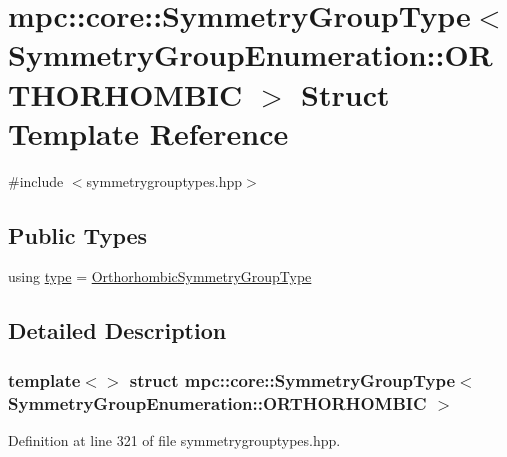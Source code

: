 \hypertarget{structmpc_1_1core_1_1_symmetry_group_type_3_01_symmetry_group_enumeration_1_1_o_r_t_h_o_r_h_o_m_b_i_c_01_4}{}\section{mpc\+:\+:core\+:\+:Symmetry\+Group\+Type$<$ Symmetry\+Group\+Enumeration\+:\+:O\+R\+T\+H\+O\+R\+H\+O\+M\+B\+IC $>$ Struct Template Reference}
\label{structmpc_1_1core_1_1_symmetry_group_type_3_01_symmetry_group_enumeration_1_1_o_r_t_h_o_r_h_o_m_b_i_c_01_4}


{\ttfamily \#include $<$symmetrygrouptypes.\+hpp$>$}

\subsection*{Public Types}
\begin{DoxyCompactItemize}
\item 
using \mbox{\hyperlink{structmpc_1_1core_1_1_symmetry_group_type_3_01_symmetry_group_enumeration_1_1_o_r_t_h_o_r_h_o_m_b_i_c_01_4_aa03457fea042819a7f1a790049474067}{type}} = \mbox{\hyperlink{structmpc_1_1core_1_1_orthorhombic_symmetry_group_type}{Orthorhombic\+Symmetry\+Group\+Type}}
\end{DoxyCompactItemize}


\subsection{Detailed Description}
\subsubsection*{template$<$$>$\newline
struct mpc\+::core\+::\+Symmetry\+Group\+Type$<$ Symmetry\+Group\+Enumeration\+::\+O\+R\+T\+H\+O\+R\+H\+O\+M\+B\+I\+C $>$}



Definition at line 321 of file symmetrygrouptypes.\+hpp.



